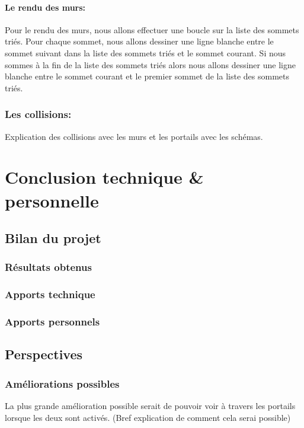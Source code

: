 \documentclass[12pt]{report}
\begin{document}
\paragraph{Le rendu des murs:}
Pour le rendu des murs, nous allons effectuer une boucle sur la liste des sommets triés. Pour chaque sommet, nous allons dessiner une ligne blanche entre le sommet suivant dans la liste des sommets triés et le sommet courant. Si nous sommes à la fin de la liste des sommets triés alors nous allons dessiner une ligne blanche entre le sommet courant et le premier sommet de la liste des sommets triés.

\subsubsection{Les collisions:}

Explication des collisions avec les murs et les portails avec les schémas.

\section{Conclusion technique \& personnelle}
\subsection{Bilan du projet}
\subsubsection{Résultats obtenus}
\subsubsection{Apports technique}
\subsubsection{Apports personnels}

\subsection{Perspectives}
\subsubsection{Améliorations possibles}

La plus grande amélioration possible serait de pouvoir voir à travers les portails
lorsque les deux sont activés. (Bref explication de comment cela serai possible)
\end{document}
